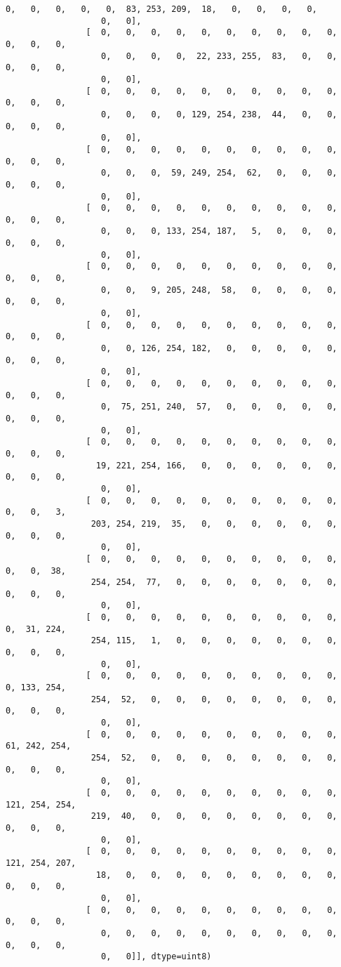 \documentclass[11pt]{article}
\begin{document}
\begin{Verbatim}[commandchars=\\\{\}]
                   0,   0,   0,   0,   0,  83, 253, 209,  18,   0,   0,   0,   0,
                   0,   0],
                [  0,   0,   0,   0,   0,   0,   0,   0,   0,   0,   0,   0,   0,
                   0,   0,   0,   0,  22, 233, 255,  83,   0,   0,   0,   0,   0,
                   0,   0],
                [  0,   0,   0,   0,   0,   0,   0,   0,   0,   0,   0,   0,   0,
                   0,   0,   0,   0, 129, 254, 238,  44,   0,   0,   0,   0,   0,
                   0,   0],
                [  0,   0,   0,   0,   0,   0,   0,   0,   0,   0,   0,   0,   0,
                   0,   0,   0,  59, 249, 254,  62,   0,   0,   0,   0,   0,   0,
                   0,   0],
                [  0,   0,   0,   0,   0,   0,   0,   0,   0,   0,   0,   0,   0,
                   0,   0,   0, 133, 254, 187,   5,   0,   0,   0,   0,   0,   0,
                   0,   0],
                [  0,   0,   0,   0,   0,   0,   0,   0,   0,   0,   0,   0,   0,
                   0,   0,   9, 205, 248,  58,   0,   0,   0,   0,   0,   0,   0,
                   0,   0],
                [  0,   0,   0,   0,   0,   0,   0,   0,   0,   0,   0,   0,   0,
                   0,   0, 126, 254, 182,   0,   0,   0,   0,   0,   0,   0,   0,
                   0,   0],
                [  0,   0,   0,   0,   0,   0,   0,   0,   0,   0,   0,   0,   0,
                   0,  75, 251, 240,  57,   0,   0,   0,   0,   0,   0,   0,   0,
                   0,   0],
                [  0,   0,   0,   0,   0,   0,   0,   0,   0,   0,   0,   0,   0,
                  19, 221, 254, 166,   0,   0,   0,   0,   0,   0,   0,   0,   0,
                   0,   0],
                [  0,   0,   0,   0,   0,   0,   0,   0,   0,   0,   0,   0,   3,
                 203, 254, 219,  35,   0,   0,   0,   0,   0,   0,   0,   0,   0,
                   0,   0],
                [  0,   0,   0,   0,   0,   0,   0,   0,   0,   0,   0,   0,  38,
                 254, 254,  77,   0,   0,   0,   0,   0,   0,   0,   0,   0,   0,
                   0,   0],
                [  0,   0,   0,   0,   0,   0,   0,   0,   0,   0,   0,  31, 224,
                 254, 115,   1,   0,   0,   0,   0,   0,   0,   0,   0,   0,   0,
                   0,   0],
                [  0,   0,   0,   0,   0,   0,   0,   0,   0,   0,   0, 133, 254,
                 254,  52,   0,   0,   0,   0,   0,   0,   0,   0,   0,   0,   0,
                   0,   0],
                [  0,   0,   0,   0,   0,   0,   0,   0,   0,   0,  61, 242, 254,
                 254,  52,   0,   0,   0,   0,   0,   0,   0,   0,   0,   0,   0,
                   0,   0],
                [  0,   0,   0,   0,   0,   0,   0,   0,   0,   0, 121, 254, 254,
                 219,  40,   0,   0,   0,   0,   0,   0,   0,   0,   0,   0,   0,
                   0,   0],
                [  0,   0,   0,   0,   0,   0,   0,   0,   0,   0, 121, 254, 207,
                  18,   0,   0,   0,   0,   0,   0,   0,   0,   0,   0,   0,   0,
                   0,   0],
                [  0,   0,   0,   0,   0,   0,   0,   0,   0,   0,   0,   0,   0,
                   0,   0,   0,   0,   0,   0,   0,   0,   0,   0,   0,   0,   0,
                   0,   0]], dtype=uint8)
\end{Verbatim}
            
\end{document}
